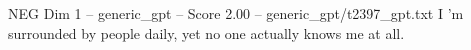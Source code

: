 \begin{textsample}{NEG Dim 1 – generic\_gpt – Score 2.00 – generic\_gpt/t2397\_gpt.txt}  \label{ex:f1_neg_038}
I ’m surrounded by people daily, yet no one actually knows me at all.

\end{textsample}
